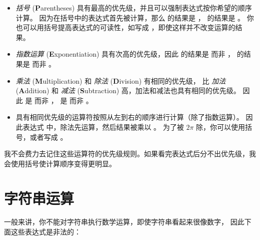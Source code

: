 \begin{itemize}

\item {\em 括号} ({\bf P}arentheses) 具有最高的优先级，并且可以强制表达式按你希望的顺序计算。 因为在括号中的表达式首先被计算，那么  的结果是 ， 的结果是 。 你也可以用括号提高表达式的可读性，如写成 ，即使这样并不改变运算的结果。

\item {\em 指数运算} ({\bf E}xponentiation) 具有次高的优先级，因此  的结果是  而非 ，  的结果是  而非 。

\item {\em 乘法} ({\bf M}ultiplication) 和 {\em 除法} ({\bf D}ivision) 有相同的优先级， 比 {\em 加法} ({\bf A}ddition) 和 {\em 减法} ({\bf S}ubtraction) 高，加法和减法也具有相同的优先级。 因此  是  而非 ，  是  而非 。

\item 具有相同优先级的运算符按照从左到右的顺序进行计算（除了指数运算）。 因此表达式  中，除法先运算，然后结果被乘以 。 为了被 $2\pi$ 除，你可以使用括号，或者写成 。

\end{itemize}


我不会费力去记住这些运算符的优先级规则。如果看完表达式后分不出优先级，我会使用括号使计算顺序变得更明显。


%
\section{字符串运算}
  
  


一般来讲，你不能对字符串执行数学运算，即使字符串看起来很像数字， 因此下面这些表达式是非法的：


